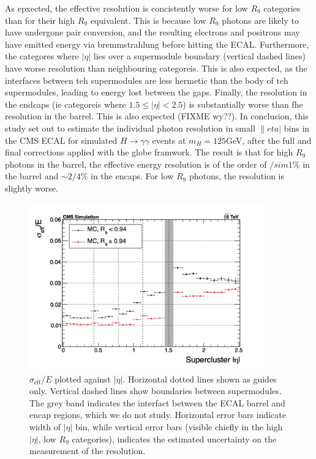 \documentclass[10pt]{article}
\begin{document}
As epxected, the effective resolution is concistently worse for low $R_{9}$ categories than for their high $R_9$ equivalent. This is because low $R_9$ photons are likely to have undergone pair conversion, and the resulting electrons and positrons may have emitted energy via bremmstrahlung before hitting the ECAL. Furthermore, the categores where $|\eta|$ lies over a supermodule boundary (vertical dashed lines) have worse resolution than neighbouring categoreis. This is also expected, as the interfaces between teh supermodules are less hermetic than the body of teh supermodules, leading to energy lost between the gaps. Finally, the resolution in the endcaps (ie categoreis where $1.5\leq |\eta| <2.5$) is substantially worse than fhe resolution in the barrel. This is also expected (FIXME wy??).
In conclusion, this study set out to estimate the individual photon resolution in small $\|eta|$ bins in the CMS ECAL for simulated $H \rightarrow \gamma \gamma$ events at $m_H =125$GeV, after the full and final corrections applied with the globe framwork. The result is that for high $R_9$ photons in the barrel, the effective energy resolution is of the order of $/sim 1\%$ in the barrel and $\sim 2/4\%$ in the encaps. For low $R_9$ photons, the resolution is slightly worse.
\begin{figure}[h!]

  \centering
\includegraphics[width=0.9\textwidth]{"EffSigma_vs_eta_mva"}
\caption{$\sigma_{\text{eff}}/E$ plotted against $|\eta|$. Horizontal dotted lines shown as guides only. Vertical dashed lines show boundaries between supermodules. The grey band indicates the interfact between the ECAL barrel and encap regions, which we do not study. Horizontal error bars indicate width of $|\eta|$ bin, while vertical error bars (visible chiefly in the high $|\eta|$, low $R_{9}$ categories), indicates the estimated uncertainty on the measurement of the resolution. }

\end{figure}
\end{document}

